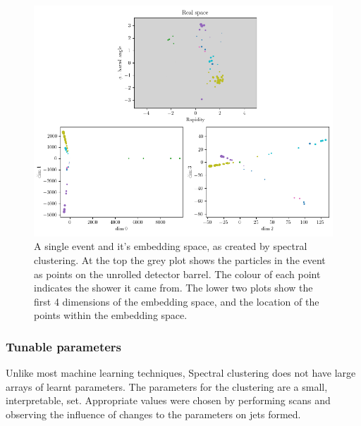     \begin{figure}[htp]
        \includegraphics[width=1\textwidth]{graphics/embedding_space_simple.png}
        \caption{A single event and it's embedding space, as created by spectral clustering.
            At the top the grey plot shows the particles in the event as points on the unrolled detector barrel.
            The colour of each point indicates the shower it came from.
            The lower two plots show the first 4 dimensions of the embedding space,
            and the location of the points within the embedding space.
        }\label{fig:embedding_space_simple}
    \end{figure}    


\subsubsection{Tunable parameters}\label{sec:spectralmethodparam}
Unlike most machine learning techniques, Spectral clustering does not have large arrays of learnt parameters.
The parameters for the clustering are a small, interpretable, set.
Appropriate values were chosen by performing scans and observing the influence of changes to the parameters on jets formed.

